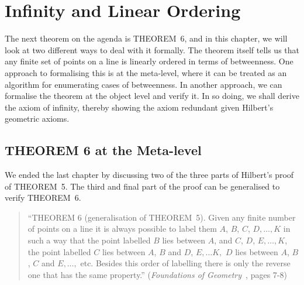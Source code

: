 \chapter{Infinity and Linear Ordering}\label{chapter:LinearOrder}
The next theorem on the agenda is THEOREM~6, and in this chapter, we will look at two different ways to deal with it formally. The theorem itself tells us that any finite set of points on a line is linearly ordered in terms of betweenness. One approach to formalising this is at the meta-level, where it can be treated as an algorithm for enumerating cases of betweenness. In another approach, we can formalise the theorem at the object level and verify it. In so doing, we shall derive the axiom of infinity, thereby showing the axiom redundant given Hilbert's geometric axioms.

\section{THEOREM 6 at the Meta-level}\label{sec:Theorem6}
We ended the last chapter by discussing two of the three parts of Hilbert's proof of THEOREM~5. The third and final part of the proof can be generalised to verify THEOREM~6.

\begin{quote}
  ``THEOREM 6 (generalisation of THEOREM~5). Given any finite number of points on a line it is always possible to label them $A$, $B$, $C$, $D, \ldots, K$ in such a way that the point labelled $B$ lies between $A$, and $C$, $D$, $E, \ldots, K$, the point labelled $C$ lies between $A$, $B$ and $D$, $E,\ldots K,$ $D$ lies between $A$, $B$, $C$ and $E, \ldots,$ etc. Besides this order of labelling there is only the reverse one that has the same property.'' (\emph{Foundations of Geometry}~\cite{FoundationsOfGeometry}, pages 7-8)
\end{quote}

